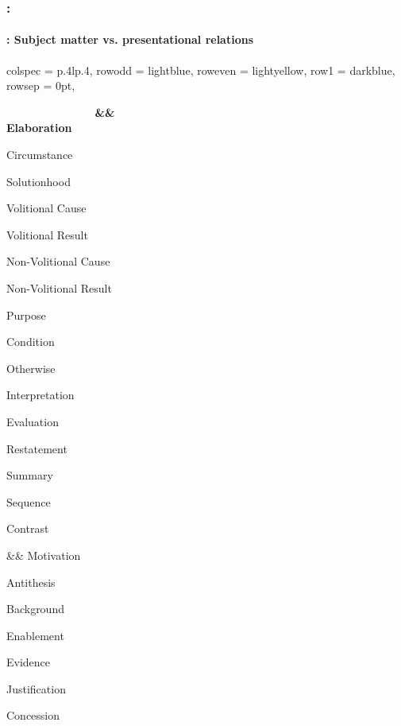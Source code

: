 \documentclass[xcolor=table]{beamer}
\begin{document}
\begin{frame}
	\frametitle{\insertshortsubtitle: \insertsection}
	\framesubtitle{\insertsubsection: Subject matter vs. presentational relations}
	
	\begin{center}
		\footnotesize
	\begin{tblr}{
			colspec = {p{.4\textwidth}lp{.4\textwidth}},
			row{odd} = {lightblue},
			row{even} = {lightyellow},
			row{1} = {darkblue},
			rowsep = 0pt,
		}

		\bfseries\textcolor{white}{Subject matter} && \bfseries\textcolor{white}{Presentational}\\
		
		Elaboration
		
		Circumstance
		
		Solutionhood
		
		Volitional Cause
		
		Volitional Result
		
		Non-Volitional Cause
		
		Non-Volitional Result
		
		Purpose
		
		Condition
		
		Otherwise
		
		Interpretation
		
		Evaluation
		
		Restatement
		
		Summary
		
		Sequence
		
		Contrast
		
		&&
		Motivation
		
		Antithesis
		
		Background
		
		Enablement
		
		Evidence
		
		Justification
		
		Concession\\
	\end{tblr}
	\end{center}
	
\end{frame}
\end{document}
